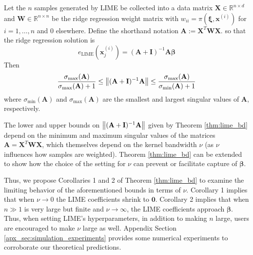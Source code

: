 \documentclass[mnsc,blindrev]{informs3}
\begin{document}
            \begin{theorem}
                \label{thm:lime_bd}
                 Let the $n$ samples generated by LIME be collected into a data matrix $\mathbf{X}\in\mathbb{R}^{n\times d}$ and $\mathbf{W}\in\mathbb{R}^{n\times n}$ be the ridge regression weight matrix with $w_{ii} = \pi(\boldsymbol{\xi},\mathbf{x}^{(i)})$ for $i=1,\ldots,n$ and 0 elsewhere. Define the shorthand notation $\mathbf{A}:= \mathbf{X}^T \mathbf{W}\mathbf{X}$. so that the ridge regression solution is
                \begin{equation*}
                    e_{\text{LIME}}(\mathbf{x}^{(i)}_j) = (\mathbf{A} + \mathbf{I})^{-1}\mathbf{A} \boldsymbol{\beta}
                \end{equation*}
                Then
                \begin{equation*}
                    \frac{\sigma_{\max}(\mathbf{A})}{\sigma_{\max}(\mathbf{A}) + 1} \leq \norm{(\mathbf{A} + \mathbf{I})^{-1}\mathbf{A}} \leq \frac{\sigma_{\max}(\mathbf{A})}{\sigma_{\min}(\mathbf{A}) + 1}
                \end{equation*}
                where $\sigma_{\min}(\mathbf{A})$ and $\sigma_{\max}(\mathbf{A})$ are the smallest and largest singular values of $\mathbf{A}$, respectively. 
            \end{theorem}
            The lower and upper bounds on $\norm{(\mathbf{A} + \mathbf{I})^{-1}\mathbf{A}}$ given by Theorem \ref{thm:lime_bd} depend on the minimum and maximum singular values of the matrices $\mathbf{A}=\mathbf{X}^T\mathbf{W}\mathbf{X}$, which themselves depend on the kernel bandwidth $\nu$ (as $\nu$ influences how samples are weighted). Theorem \ref{thm:lime_bd} can be extended to show how the choice of the setting for $\nu$ can prevent or facilitate capture of $\boldsymbol{\beta}$.
            
            Thus, we propose Corollaries 1 and 2 of Theorem \ref{thm:lime_bd} to examine the limiting behavior of the aforementioned bounds in terms of $\nu$. Corollary 1 implies that when $\nu \rightarrow 0$ the LIME coefficients shrink to $\mathbf{0}$. Corollary 2 implies that when $n \gg 1$ is very large but finite and $\nu \rightarrow \infty$, the LIME coefficients approach $\boldsymbol{\beta}$.  Thus, when setting LIME's hyperparameters, in addition to making $n$ large, users are encouraged to make $\nu$ large as well. Appendix Section \ref{apx_sec:simulation_experiments} provides some numerical experiments to corroborate our theoretical predictions. 
\end{document}
